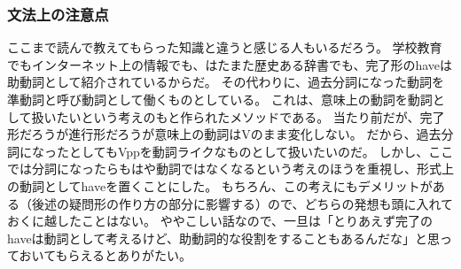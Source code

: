 \subsubsection{文法上の注意点}

ここまで読んで教えてもらった知識と違うと感じる人もいるだろう。
学校教育でもインターネット上の情報でも、はたまた歴史ある辞書でも、完了形のhaveは助動詞として紹介されているからだ。
その代わりに、過去分詞になった動詞を準動詞と呼び動詞として働くものとしている。
これは、意味上の動詞を動詞として扱いたいという考えのもと作られたメソッドである。
当たり前だが、完了形だろうが進行形だろうが意味上の動詞はVのまま変化しない。
だから、過去分詞になったとしてもVppを動詞ライクなものとして扱いたいのだ。
しかし、ここでは分詞になったらもはや動詞ではなくなるという考えのほうを重視し、形式上の動詞としてhaveを置くことにした。
もちろん、この考えにもデメリットがある（後述の疑問形の作り方の部分に影響する）ので、どちらの発想も頭に入れておくに越したことはない。
ややこしい話なので、一旦は「とりあえず完了のhaveは動詞として考えるけど、助動詞的な役割をすることもあるんだな」と思っておいてもらえるとありがたい。


